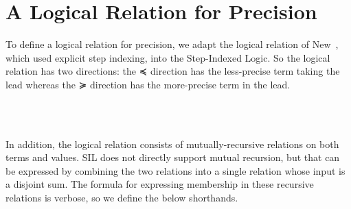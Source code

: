 \section{A Logical Relation for Precision}
\label{sec:log-rel}

To define a logical relation for precision, we adapt the logical
relation of New~\cite{New:2020ab}, which used explicit step indexing,
into the Step-Indexed Logic. So the logical relation has two directions:
the ≼ direction has the less-precise term taking the lead whereas the
≽ direction has the more-precise term in the lead.

\begin{code}%
\>[0]\AgdaSpace{}%
\AgdaSpace{}%
\AgdaSymbol{:}\AgdaSpace{}%
\AgdaSpace{}%
\<%
\\
\>[0][@{}l@{\AgdaIndent{0}}]%
\>[2]\AgdaSpace{}%
\AgdaSymbol{:}\AgdaSpace{}%
\<%
\\
%
\>[2]\AgdaSpace{}%
\AgdaSymbol{:}\AgdaSpace{}%
\<%
\end{code}

In addition, the logical relation consists of mutually-recursive
relations on both terms and values. SIL does not directly support
mutual recursion, but that can be expressed by combining the two
relations into a single relation whose input is a disjoint sum.  The
formula for expressing membership in these recursive relations is
verbose, so we define the below shorthands.

